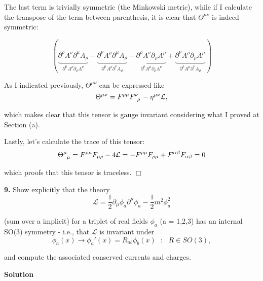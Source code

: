 \documentclass[12pt]{article}
\newcommand{\qedwhite}{\hfill \ensuremath{\Box}}
\begin{document}
The last term is trivially symmetric (the Minkowski metric), while if I calculate the transpose of the term between parenthesis, it is clear that \( \Theta^{\mu\nu} \) is indeed symmetric:

\[
( \underbrace{ \partial^\rho A^\nu \partial^\mu A_\rho }_{ \partial^\mu A^\rho \partial_\rho A^\nu } - \underbrace{ \partial^\nu A^\rho \partial^\mu A_\rho }_{ \partial^\mu A^\rho \partial^\nu A_\rho } - \underbrace{ \partial^\rho A^\nu \partial_\rho A^\mu }_{ \partial^\rho A^\mu \partial_\rho A^\nu } + \underbrace{ \partial^\nu A^\rho \partial_\rho A^\mu }_{ \partial^\rho A^\mu \partial^\nu A_\rho } )
\]

As I indicated previously, \( \Theta^{\mu\nu} \) can be expressed like
\[
    \Theta^{\mu\nu} = F^{\rho\mu} \tensor{F}{^\nu_\rho} - \eta^{\mu\nu} \mathcal{L},
\]

which makes clear that this tensor is gauge invariant considering what I proved at Section (a).

Lastly, let's calculate the trace of this tensor:
\[
    \tensor{ \Theta }{^\mu_\mu} = F^{\rho\mu}F_{\mu\rho} - 4 \mathcal{L} = - F^{\rho\mu}F_{\rho\mu} + F^{\alpha\beta}F_{\alpha\beta} = 0
\]

which proofs that this tensor is traceless. \qedwhite
\color{black}

\newpage
\textbf{9.} Show explicitly that the theory
\[
    \mathcal{L} = \frac{1}{2} \partial_\mu \phi_a \partial^\mu \phi_a - \frac{1}{2} m^2 \phi_a^2
\]

(sum over a implicit) for a triplet of real fields \( \phi_a \) (a = 1,2,3) has an internal SO(3) symmetry - i.e., that \( \mathcal{L} \) is invariant under
\[
    \phi_a(x) \longrightarrow \phi_a'(x) = R_{ab} \phi_b(x) ~~~:~~~ R \in SO(3),
\]

and compute the associated conserved currents and charges.

\color{blue}

\textbf{Solution}

\vspace{0.25cm}


\vspace{0.25cm}
\end{document}
